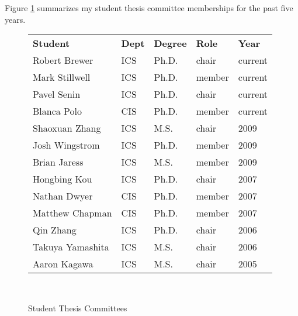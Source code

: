 \documentclass[11pt]{article}
\begin{document}
\noindent Figure \ref{fig:student-committees} summarizes my student thesis committee memberships for the past five years. 

\begin{figure}[!ht]
\small
\begin{tabular}{p{3in}llll} \hline
{\bf Student} & {\bf Dept} & {\bf Degree} & {\bf Role} & {\bf Year}  \\
 Robert Brewer &  ICS &  Ph.D. &  chair &  current \\
 Mark Stillwell &  ICS &  Ph.D. &  member &  current \\
 Pavel Senin &  ICS &  Ph.D. &  chair &  current \\
 Blanca Polo &  CIS &  Ph.D. & member &  current \\
 Shaoxuan Zhang &  ICS &  M.S. & chair &  2009 \\
 Josh Wingstrom &  ICS &  Ph.D. & member &  2009 \\
 Brian Jaress &  ICS &  M.S. &  member &  2009 \\
 Hongbing Kou &  ICS &  Ph.D. &  chair &  2007  \\
 Nathan Dwyer &  CIS &  Ph.D. & member &  2007 \\
 Matthew Chapman &  CIS &  Ph.D. & member &  2007 \\
 Qin Zhang &  ICS &  Ph.D. &  chair &  2006 \\
 Takuya Yamashita &  ICS &  M.S. &  chair &  2006 \\
 Aaron Kagawa &  ICS &  M.S. &  chair &  2005 \\ \hline
\end{tabular} \\ 
\caption{Student Thesis Committees}
\label{fig:student-committees}
\normalsize
\end{figure}
\end{document}
